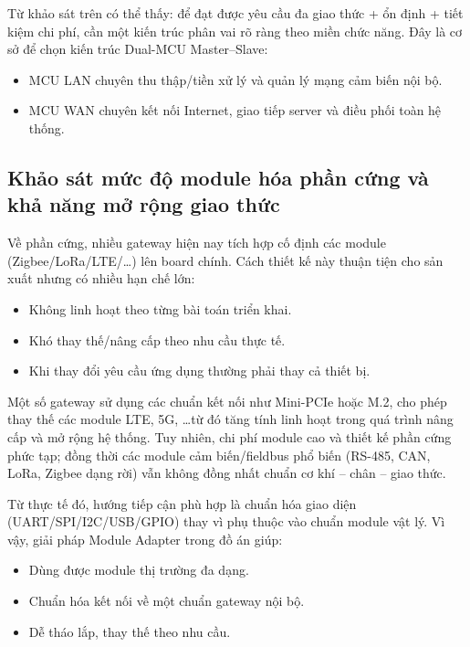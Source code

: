         Từ khảo sát trên có thể thấy: để đạt được yêu cầu đa giao thức + ổn định + tiết kiệm chi phí, cần một kiến trúc phân vai rõ ràng theo miền chức năng. Đây là cơ sở để chọn kiến trúc Dual-MCU Master–Slave:
        \begin{itemize}
            \item MCU LAN chuyên thu thập/tiền xử lý và quản lý mạng cảm biến nội bộ.
            \item MCU WAN chuyên kết nối Internet, giao tiếp server và điều phối toàn hệ thống.
        \end{itemize}

    \subsection{Khảo sát mức độ module hóa phần cứng và khả năng mở rộng giao thức}
        Về phần cứng, nhiều gateway hiện nay tích hợp cố định các module (Zigbee/LoRa/LTE/\ldots) lên board chính. Cách thiết kế này thuận tiện cho sản xuất nhưng có nhiều hạn chế lớn:
        \begin{itemize}
            \item Không linh hoạt theo từng bài toán triển khai.
            \item Khó thay thế/nâng cấp theo nhu cầu thực tế.
            \item Khi thay đổi yêu cầu ứng dụng thường phải thay cả thiết bị.
        \end{itemize}

        Một số gateway sử dụng các chuẩn kết nối như Mini-PCIe hoặc M.2, cho phép thay thế các module LTE, 5G, \ldots từ đó tăng tính linh hoạt trong quá trình nâng cấp và mở rộng hệ thống. Tuy nhiên, chi phí module cao và thiết kế phần cứng phức tạp; đồng thời các module cảm biến/fieldbus phổ biến (RS-485, CAN, LoRa, Zigbee dạng rời) vẫn không đồng nhất chuẩn cơ khí – chân – giao thức.

        Từ thực tế đó, hướng tiếp cận phù hợp là chuẩn hóa giao diện (UART/SPI/I2C/USB/GPIO) thay vì phụ thuộc vào chuẩn module vật lý. Vì vậy, giải pháp Module Adapter trong đồ án giúp:
        \begin{itemize}
            \item Dùng được module thị trường đa dạng.
            \item Chuẩn hóa kết nối về một chuẩn gateway nội bộ.
            \item Dễ tháo lắp, thay thế theo nhu cầu.
        \end{itemize}


